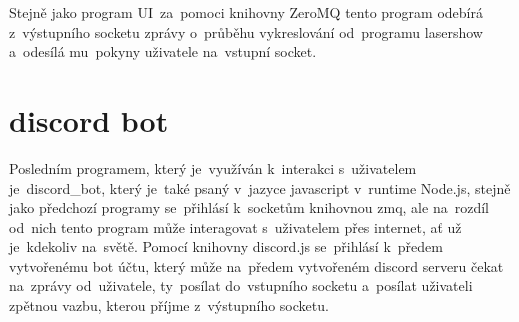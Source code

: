 Stejně jako program UI~za~pomoci knihovny ZeroMQ tento program odebírá z~výstupního socketu zprávy o~průběhu vykreslování od~programu lasershow a~odesílá mu~pokyny uživatele na~vstupní socket.



\section{discord bot}

Posledním programem, který je~využíván k~interakci s~uživatelem je~discord\_bot, který je~také psaný v~jazyce javascript v~runtime Node.js, stejně jako předchozí programy se~přihlásí k~socketům knihovnou zmq, ale na~rozdíl od~nich tento program může interagovat s~uživatelem přes internet, ať už je~kdekoliv na~světě.
Pomocí knihovny discord.js se~přihlásí k~předem vytvořenému bot účtu, který může na~předem vytvořeném discord serveru čekat na~zprávy od~uživatele, ty~posílat do~vstupního socketu a~posílat uživateli zpětnou vazbu, kterou příjme z~výstupního socketu.

